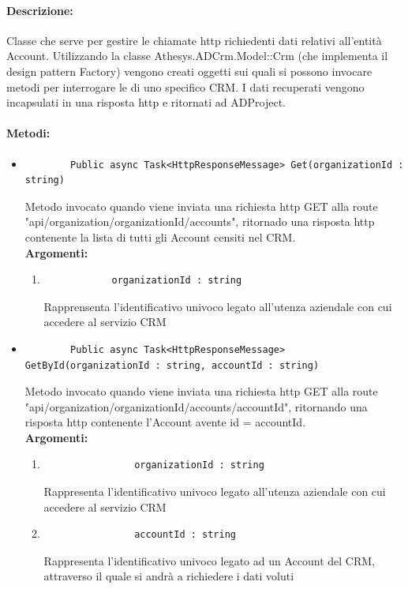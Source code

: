 \paragraph{Descrizione:}
Classe che serve per gestire le chiamate \gls{http} richiedenti dati relativi all'entità Account. Utilizzando la classe Athesys.ADCrm.Model::Crm (che implementa il design pattern Factory) vengono creati oggetti sui quali si possono invocare metodi per interrogare le  di uno specifico CRM.
I dati recuperati vengono incapsulati in una risposta \gls{http} e ritornati ad ADProject.

\paragraph{Metodi:}\hfill
\begin{itemize}
	\itemsep0em 
	\item 
		\begin{lstlisting}
		Public async Task<HttpResponseMessage> Get(organizationId : string)
		\end{lstlisting}
		Metodo invocato quando viene inviata una richiesta \gls{http} GET alla route "api/organization/{organizationId}/accounts", ritornado una risposta \gls{http} contenente la lista di tutti gli Account censiti nel CRM.\\
		\textbf{\small Argomenti:}
		\begin{enumerate}[leftmargin=*]
			\itemsep0em 
			\item \begin{lstlisting}
			organizationId : string 
			\end{lstlisting}
			Rapprensenta l'identificativo univoco legato all'utenza aziendale con cui accedere al servizio CRM
		\end{enumerate}
		
	\item 
		\begin{lstlisting}
		Public async Task<HttpResponseMessage> GetById(organizationId : string, accountId : string)
		\end{lstlisting}
		Metodo invocato quando viene inviata una richiesta \gls{http} GET alla route "api/organization/{organizationId}/accounts/{accountId}", ritornando una risposta \gls{http} contenente l'Account avente id = {accountId}.\\
		\textbf{\small Argomenti:}
		\begin{enumerate}[leftmargin=*]
			\itemsep0em 
			\item 
				\begin{lstlisting}
				organizationId : string 
				\end{lstlisting}
				Rappresenta l'identificativo univoco legato all'utenza aziendale con cui accedere al servizio CRM
			\item 
				\begin{lstlisting}
				accountId : string
				\end{lstlisting}
				Rappresenta l'identificativo univoco legato ad un Account del CRM, attraverso il quale si andrà a richiedere i dati voluti
		\end{enumerate}
\end{itemize}

